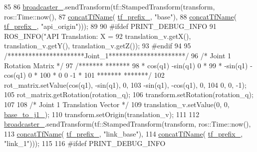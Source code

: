 \begin{DoxyCode}
{85 
86     \hyperlink{classjaco_1_1JacoKinematics_a3314f9e6a8fb86405384dd23bd194e46}{broadcaster\_}.sendTransform(tf::StampedTransform(transform, ros::Time::now(),
87                                                     \hyperlink{namespacejaco_a6320c11725be13d2957c4e3f474d62f8}{concatTfName}(
      \hyperlink{classjaco_1_1JacoKinematics_a0efb1f0ad1937553c7e285b27da0bdd3}{tf\_prefix\_}, \textcolor{stringliteral}{"base"}),
88                                                     \hyperlink{namespacejaco_a6320c11725be13d2957c4e3f474d62f8}{concatTfName}(
      \hyperlink{classjaco_1_1JacoKinematics_a0efb1f0ad1937553c7e285b27da0bdd3}{tf\_prefix\_}, \textcolor{stringliteral}{"api\_origin"})));
89 
90 \textcolor{preprocessor}{#ifdef PRINT\_DEBUG\_INFO}
91     ROS\_INFO(\textcolor{stringliteral}{"API Translation: X = %
92              translation\_v.getX(), translation\_v.getY(), translation\_v.getZ());
93 \textcolor{preprocessor}{#endif}
94 
95     \textcolor{comment}{/**********************Joint\_1**********************/}
96     \textcolor{comment}{/* Joint 1 Rotation Matrix */}
97     \textcolor{comment}{/*******                 *******}
98 \textcolor{comment}{     * cos(q1)    -sin(q1)      0  *}
99 \textcolor{comment}{     * -sin(q1)   -cos(q1)      0  *}
100 \textcolor{comment}{     * 0            0          -1  *}
101 \textcolor{comment}{     *******                *******/}
102     rot\_matrix.setValue(cos(q1), -sin(q1), 0,
103                         -sin(q1), -cos(q1), 0,
104                         0, 0, -1);
105     rot\_matrix.getRotation(rotation\_q);
106     transform.setRotation(rotation\_q);
107 
108     \textcolor{comment}{/* Joint 1 Translation Vector */}
109     translation\_v.setValue(0, 0, \hyperlink{classjaco_1_1JacoKinematics_a7f67ac2a11176769a3477924f46c7284}{base\_to\_j1\_});
110     transform.setOrigin(translation\_v);
111 
112     \hyperlink{classjaco_1_1JacoKinematics_a3314f9e6a8fb86405384dd23bd194e46}{broadcaster\_}.sendTransform(tf::StampedTransform(transform, ros::Time::now(),
113                                                     \hyperlink{namespacejaco_a6320c11725be13d2957c4e3f474d62f8}{concatTfName}(
      \hyperlink{classjaco_1_1JacoKinematics_a0efb1f0ad1937553c7e285b27da0bdd3}{tf\_prefix\_}, \textcolor{stringliteral}{"link\_base"}),
114                                                     \hyperlink{namespacejaco_a6320c11725be13d2957c4e3f474d62f8}{concatTfName}(
      \hyperlink{classjaco_1_1JacoKinematics_a0efb1f0ad1937553c7e285b27da0bdd3}{tf\_prefix\_}, \textcolor{stringliteral}{"link\_1"})));
115 
116 \textcolor{preprocessor}{#ifdef PRINT\_DEBUG\_INFO}
}}
\end{DoxyCode}
